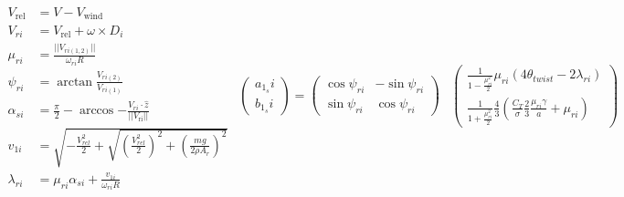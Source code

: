     \begin{subequations}
        \label{eq:observer:flapping}
        \begin{align}
            V_{\text{rel}} &= V - V_{\text{wind}} \\
%
            V_{ri} &= V_{\text{rel}} + \omega \times D_{i} \\ %
%
            \mu_{ri} &= \frac{||V_{ri(1,2)}||}{\omega_{ri}R} \\
%
            \psi_{ri} &= \arctan{\frac{V_{ri(2)}}{V_{ri(1)}}} \\%
%
            \alpha_{si} &= \frac{\pi}{2} - \arccos{ -\frac{V_{ri} \cdot \hat{z}}{||V_{\text{ri}}||} } \\
%
            v_{1i} &= \sqrt{
                -\frac{V_{rel}^{2}}{2} + \sqrt{
                    \left( \frac{V_{rel}^{2}}{2} \right)^{2}
                    + \left( \frac{mg}{2 \rho A_{r}} \right)^{2}
                }
            }\\
%
            \lambda_{ri} &= \mu_{ri}\alpha_{si} + \frac{v_{1i}}{\omega_{ri} R} \label{eq:observer:lambdari}
        \end{align}
        \begin{equation}
            \label{eq:observer:flapping:ab}
            \begin{array}{rr}\left(
                \begin{array}{c}
                    a_{1_{s}}i \\
                    b_{1_{s}}i
                \end{array} \right)
                = \left(
                \begin{array}{cc}
                    \cos{\psi_{ri}} & -\sin{\psi_{ri}} \\
                    \sin{\psi_{ri}} & \cos{\psi_{ri}}
                \end{array}
                \right) & \left(
                    \begin{array}{c}
                        \frac{1}{1 - \frac{\mu_{ri}^{2}}{2}}\mu_{ri}\left( 4 \theta_{twist} - 2\lambda_{ri}\right) \\
                        \frac{1}{1 + \frac{\mu_{ri}^{2}}{2}}\frac{4}{3}\left( \frac{C_{T}}{\sigma}\frac{2}{3}\frac{\mu_{ri}\gamma}{a} + \mu_{ri}\right)
                    \end{array}
                \right) \\

\end{array}
\end{equation}
\end{subequations}
